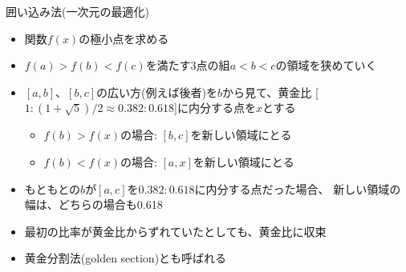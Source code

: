 \begin{frame}[t,fragile]{囲い込み法(一次元の最適化)}
  \begin{itemize}
  \item 関数$f(x)$の極小点を求める
  \item $f(a) > f(b) < f(c)$を満たす3点の組$a < b < c$の領域を狭めていく
  \item $[a,b]$、$[b,c]$の広い方(例えば後者)を$b$から見て、黄金比
    [$1:(1+\sqrt{5})/2 \approx 0.382:0.618$]に内分する点を$x$とする
    \begin{itemize}
    \item $f(b) > f(x)$の場合: $[b,c]$を新しい領域にとる
    \item $f(b) < f(x)$の場合: $[a,x]$を新しい領域にとる
    \end{itemize}
  \item もともとの$b$が$[a,c]$を$0.382:0.618$に内分する点だった場合、
    新しい領域の幅は、どちらの場合も0.618
  \item 最初の比率が黄金比からずれていたとしても、黄金比に収束
  \item 黄金分割法(golden section)とも呼ばれる
  \end{itemize}
\end{frame}
